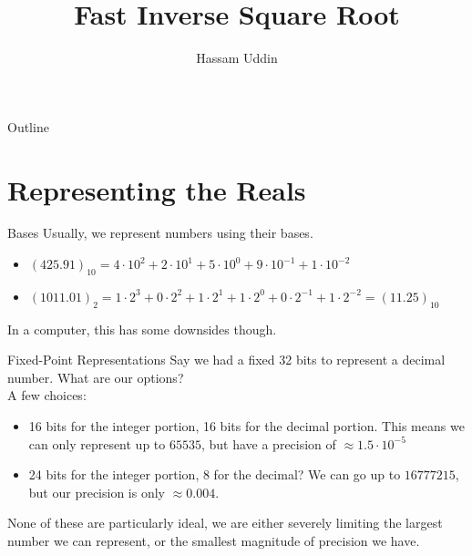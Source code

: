 \documentclass[aspectratio=169]{beamer}
\title{Fast Inverse Square Root}
\subtitle{}
\author{Hassam Uddin}
\date{}
\begin{document}

\begin{frame}
\titlepage
\end{frame}

\begin{frame}{Outline}
  \tableofcontents
\end{frame}


\section{Representing the Reals}
\frame{\sectionpage}

\begin{frame}{Bases}
    Usually, we represent numbers using their bases. \pause 
    \begin{itemize}
        \item $(425.91)_{10} = 4 \cdot 10^2 + 2\cdot 10^1 + 5 \cdot 10^0 + 9\cdot10^{-1} + 1\cdot 10^{-2}$ \pause 
        \item $(1011.01)_2 = 1\cdot2^3 + 0\cdot 2^{2} + 1\cdot2^1 + 1\cdot2^0 + 0\cdot 2^{-1} + 1 \cdot 2^{-2} = (11.25)_{10}$ \pause 
    \end{itemize}

    In a computer, this has some downsides though. 
\end{frame}


\begin{frame}{Fixed-Point Representations}
    Say we had a fixed 32 bits to represent a decimal number. What are our options? \pause 
    \\
    A few choices: \pause 
    \begin{itemize}
        \item 16 bits for the integer portion, 16 bits for the decimal portion. This means we can only represent up to $65535$, but have a precision of $\approx 1.5 \cdot 10^{-5}$ \pause 
        \item 24 bits for the integer portion, 8 for the decimal? We can go up to $16777215$, but our precision is only $\approx 0.004$. \pause   
    \end{itemize}
    None of these are particularly ideal, we are either severely limiting the largest number we can represent, or the smallest magnitude of precision we have. 
\end{frame}
\end{document}
